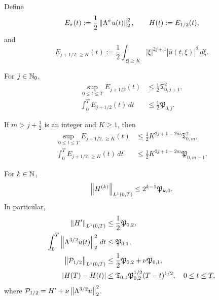 \begin{proposition}
\label{prop:qc-critical-height}
Define
\[
 E_\sigma(t):=\frac12\left\lVert \Lambda^\sigma u(t)\right\rVert_2^2,
 \qquad
 H(t):=E_{1/2}(t),
\]
and
\[
 E_{j+1/2,\ge K}(t)
 :=\frac12\int_{|\xi|\ge K}|\xi|^{2j+1}
 |\widehat u(t,\xi)|^2\,d\xi.
\]
\begin{samepage}
For \(j\in\mathbb N_0\),
\begin{align}
 \sup_{0\le t\le T}E_{j+1/2}(t)
 &\le\frac12\mathfrak T_{0,j+1}^2,
 \label{eq:qc-critical-sup}\\
 \int_0^T E_{j+1/2}(t)\,dt
 &\le\frac12\mathfrak P_{0,j}.
 \label{eq:qc-critical-mass}
\end{align}
\end{samepage}
If \(m>j+\frac12\) is an integer and \(K\ge1\), then
\begin{align}
 \sup_{0\le t\le T}E_{j+1/2,\ge K}(t)
 &\le\frac12K^{2j+1-2m}\mathfrak T_{0,m}^2,
 \label{eq:qc-critical-tail-sup}\\
 \int_0^T E_{j+1/2,\ge K}(t)\,dt
 &\le\frac12K^{2j+1-2m}\mathfrak P_{0,m-1}.
 \label{eq:qc-critical-tail-mass}
\end{align}
\begin{samepage}
For \(k\in\mathbb N\),
\begin{equation}
 \left\lVert H^{(k)}\right\rVert_{L^1(0,T)}
 \le2^{k-1}\mathfrak P_{k,0}.
 \label{eq:qc-height-derivatives}
\end{equation}
In particular,
\begin{align}
 \left\lVert H'\right\rVert_{L^1(0,T)}
 &\le\frac12\mathfrak P_{0,2},
 \label{eq:qc-critical-variation}\\
 \int_0^T\left\lVert \Lambda^{3/2}u(t)\right\rVert_2^2\,dt
 &\le\mathfrak P_{0,1},
 \label{eq:qc-critical-dissipation}\\
 \left\lVert \mathcal P_{1/2}\right\rVert_{L^1(0,T)}
 &\le\frac12\mathfrak P_{0,2}+\nu\mathfrak P_{0,1},
 \label{eq:qc-critical-current}\\
 |H(T)-H(t)|
 &\le
 \mathfrak T_{0,1}\mathfrak P_{0,2}^{1/2}(T-t)^{1/2},
 \quad0\le t\le T,
 \label{eq:qc-critical-endpoint-modulus}
\end{align}
where
\(\mathcal P_{1/2}=H'+\nu\left\lVert \Lambda^{3/2}u\right\rVert_2^2\).
\end{samepage}
\end{proposition}

